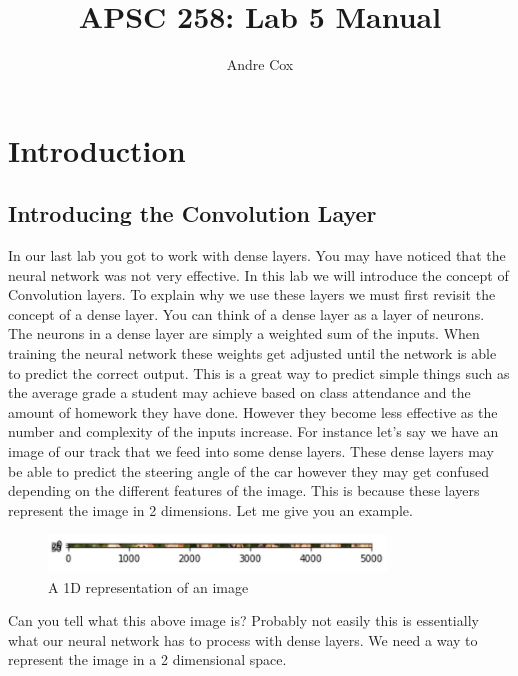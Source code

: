 \documentclass[11pt]{report}
\title{APSC 258: Lab 5 Manual}
\author{Andre Cox}
\begin{document}
\maketitle
\tableofcontents

\clearpage

\chapter{Introduction}
\section{Introducing the Convolution Layer}
In our last lab you got to work with dense layers. You may have noticed that the neural network was not very effective. In this lab we will introduce the concept of Convolution layers. To explain why we use these layers we must first revisit the concept of a dense layer. You can think of a dense layer as a layer of neurons. The neurons in a dense layer are simply a weighted sum of the inputs. When training the neural network these weights get adjusted until the network is able to predict the correct output. This is a great way to predict simple things such as the average grade a student may achieve based on class attendance and the amount of homework they have done. However they become less effective as the number and complexity of the inputs increase. For instance let's say we have an image of our track that we feed into some dense layers. These dense layers may be able to predict the steering angle of the car however they may get confused depending on the different features of the image. This is because these layers represent the image in 2 dimensions. Let me give you an example. 

\begin{figure}[h]
\centering
\includegraphics[width=0.8\textwidth]{./images/dogdense.png}
\caption{A 1D representation of an image}
\label{fig:1d}
\end{figure}

Can you tell what this above image is? Probably not easily this is essentially what our neural network has to process with dense layers. We need a way to represent the image in a 2 dimensional space.
\end{document}
